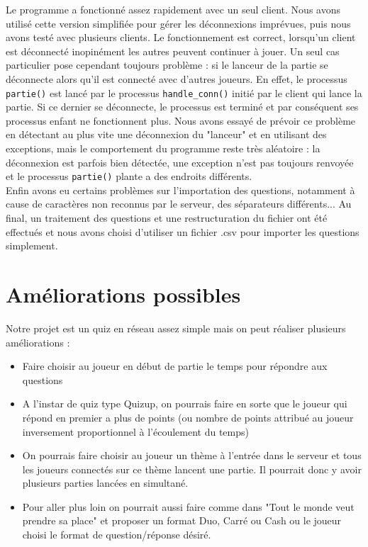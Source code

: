 \documentclass[12pt, a4paper]{article}
\begin{document}
Le programme a fonctionné assez rapidement avec un seul client. Nous avons utilisé cette version simplifiée pour gérer les déconnexions imprévues, puis nous avons testé avec plusieurs clients. Le fonctionnement est correct, lorsqu'un client est déconnecté inopinément les autres peuvent continuer à jouer. Un seul cas particulier pose cependant toujours problème : si le lanceur de la partie se déconnecte alors qu'il est connecté avec d'autres joueurs. En effet, le processus \texttt{partie()} est lancé par le processus \texttt{handle\_conn()} initié par le client qui lance la partie. Si ce dernier se déconnecte, le processus est terminé et par conséquent ses processus enfant ne fonctionnent plus. Nous avons essayé de prévoir ce problème en détectant au plus vite une déconnexion du "lanceur" et en utilisant des exceptions, mais le comportement du programme reste très aléatoire : la déconnexion est parfois bien détectée, une exception n'est pas toujours renvoyée et le processus \texttt{partie()} plante a des endroits différents.\\
    
Enfin avons eu certains problèmes sur l'importation des questions, notamment à cause de caractères non reconnus par le serveur, des séparateurs différents... Au final, un traitement des questions et une restructuration du fichier ont été effectués et nous avons choisi d'utiliser un fichier .csv pour importer les questions simplement.


\section{Améliorations possibles}
Notre projet est un quiz en réseau assez simple mais on peut réaliser plusieurs améliorations :
\begin{itemize}
    \item Faire choisir au joueur en début de partie le temps pour répondre aux questions
    \item A l'instar de quiz type Quizup, on pourrais faire en sorte que le joueur qui répond en premier a plus de points (ou nombre de points attribué au joueur inversement proportionnel à l'écoulement du temps)
    \item On pourrais faire choisir au joueur un thème à l'entrée dans le serveur et tous les joueurs connectés sur ce thème lancent une partie. Il pourrait donc y avoir plusieurs parties lancées en simultané.
    \item Pour aller plus loin on pourrait aussi faire comme dans "Tout le monde veut prendre sa place" et proposer un format Duo, Carré ou Cash ou le joueur choisi le format de question/réponse désiré.
\end{itemize}
\end{document}
